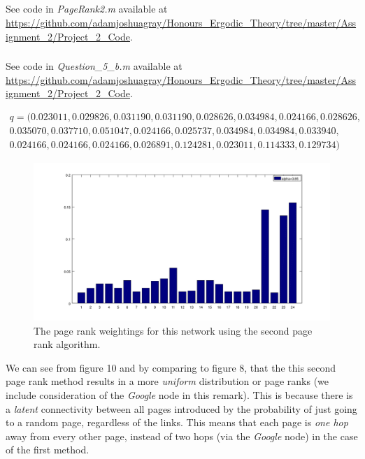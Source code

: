 \documentclass{unswmaths}
\begin{document}
\subsection{}
\subsubsection{}
See code in \emph{PageRank2.m} available at \url{https://github.com/adamjoshuagray/Honours_Ergodic_Theory/tree/master/Assignment_2/Project_2_Code}. 
\subsubsection{}
See code in \emph{Question\_5\_b.m} available at \url{https://github.com/adamjoshuagray/Honours_Ergodic_Theory/tree/master/Assignment_2/Project_2_Code}. 

\begin{align*}
    q = (
   0.023011,
   0.029826,
   0.031190,
   0.031190,
   0.028626,
   0.034984,
   0.024166,
   0.028626, \\
   0.035070,
   0.037710,
   0.051047,
   0.024166,
   0.025737,
   0.034984,
   0.034984,
   0.033940, \\
   0.024166,
   0.024166,
   0.024166,
   0.026891,
   0.124281,
   0.023011,
   0.114333,
   0.129734
)
\end{align*}
\begin{figure}[h]
    \includegraphics[scale=0.4]{Second_Rank}
    \caption{The page rank weightings for this network using the second page rank algorithm.}
\end{figure}


We can see from figure 10 and by comparing to figure 8, that the this second page rank method results in a more \emph{uniform} distribution or page ranks (we include consideration of the \emph{Google} node in this remark). This is because there is a \emph{latent} connectivity between all pages introduced by the probability of just going to a random page, regardless of the links. This means that each page is \emph{one hop} away from every other page, instead of two hops (via the \emph{Google} node) in the case of the first method. 
\end{document}
